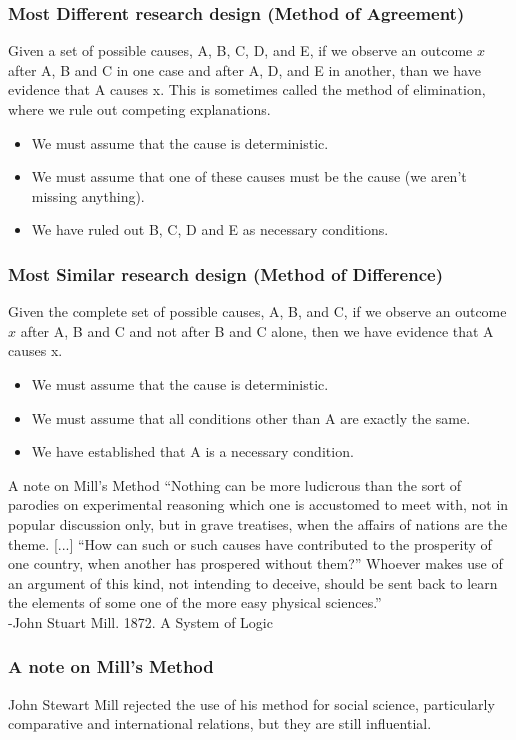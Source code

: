 \documentclass[handout]{beamer}
\numberwithin{equation}{section}
\begin{document}
\begin{frame}
\frametitle{Most Different research design (Method of Agreement)}

Given a set of possible causes, A, B, C, D, and E, if we observe an outcome $x$ after A, B and C in one case and after A, D, and E in another, than we have evidence that A causes x.\pause
This is sometimes called the method of elimination, where we rule out competing explanations.\\
\pause
\begin{itemize}
\item We must assume that the cause is deterministic.
\item We must assume that one of these causes must be the cause (we aren't missing anything).
\item We have ruled out B, C, D and E as necessary conditions.
\end{itemize}

\end{frame}


\begin{frame}
\frametitle{Most Similar research design (Method of Difference)}

Given the complete set of possible causes, A, B, and C, if we observe an outcome $x$ after A, B and C and not after B and C alone, then we have evidence that A causes x.\pause
\begin{itemize}
\item We must assume that the cause is deterministic.
\item We must assume that all conditions other than A are exactly the same.
\item We have established that A is a necessary condition.
\end{itemize}


\end{frame}


\begin{frame}{A note on Mill's Method}
``Nothing can be more ludicrous than the sort of parodies on experimental reasoning which one is accustomed to meet with, not in popular discussion only, but in grave treatises, when the affairs of nations are the theme. [...] ``How can such or such causes have contributed to the prosperity of one country, when another has prospered without them?'' Whoever makes use of an argument of this kind, not intending to deceive, should be sent back to learn the elements of some one of the more easy physical sciences.''\\
\hfill-John Stuart Mill. 1872. A System of Logic
\end{frame}


\begin{frame}
\frametitle{A note on Mill's Method}
John Stewart Mill rejected the use of his method for social science, particularly comparative and international relations, but they are still influential.

\end{frame}
\end{document}
